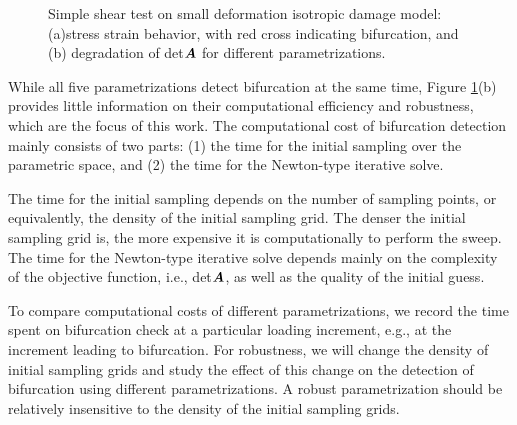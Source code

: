 \documentclass[12pt]{article}
\numberwithin{equation}{section}
\begin{document}
\begin{figure}[H]
  \centering {} 
  \caption{Simple shear test on small deformation 
  isotropic damage model: 
  (a)stress strain behavior, with red cross indicating bifurcation, and
  (b) degradation of det${\boldsymbol{A}}$ for different
  parametrizations.}
  \label{fig:iso_stress_strain}
\end{figure}

While all five parametrizations detect bifurcation at the same time, 
Figure \ref{fig:iso_stress_strain}(b) provides little information on 
their computational efficiency and robustness, which are the focus of 
this work. The computational cost of bifurcation detection mainly 
consists of two parts: (1) the time for the initial sampling over the 
parametric space, and (2) the time for the Newton-type iterative 
solve. 

The time for the initial sampling depends on the number of sampling 
points, or equivalently, the density of the initial sampling grid. The 
denser the initial sampling grid is, the more expensive it is 
computationally to perform the sweep. The time for the Newton-type 
iterative solve depends mainly on the complexity of the objective 
function, i.e., det${\boldsymbol{A}}$, as well as the quality of the initial guess.

To compare computational costs of different parametrizations, we 
record the time spent on bifurcation check at a particular loading 
increment, e.g., at the increment leading to bifurcation. For 
robustness, we will change the density of initial sampling grids and 
study the effect of this change on the detection of bifurcation using 
different parametrizations. A robust parametrization should be 
relatively insensitive to the density of the initial sampling grids.
\end{document}
